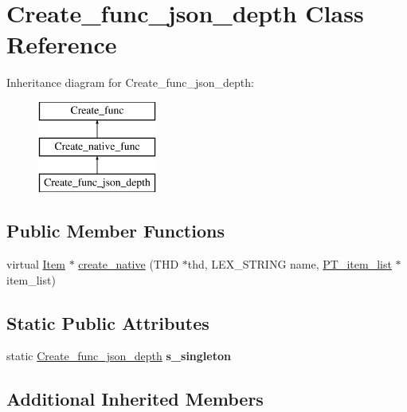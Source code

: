 \hypertarget{classCreate__func__json__depth}{}\section{Create\+\_\+func\+\_\+json\+\_\+depth Class Reference}
\label{classCreate__func__json__depth}
Inheritance diagram for Create\+\_\+func\+\_\+json\+\_\+depth\+:\begin{figure}[H]
\begin{center}
\leavevmode
\includegraphics[height=3.000000cm]{classCreate__func__json__depth}
\end{center}
\end{figure}
\subsection*{Public Member Functions}
\begin{DoxyCompactItemize}
\item 
virtual \mbox{\hyperlink{classItem}{Item}} $\ast$ \mbox{\hyperlink{classCreate__func__json__depth_a143fa7a6b3c0bf42055c7f039603bbbc}{create\+\_\+native}} (T\+HD $\ast$thd, L\+E\+X\+\_\+\+S\+T\+R\+I\+NG name, \mbox{\hyperlink{classPT__item__list}{P\+T\+\_\+item\+\_\+list}} $\ast$item\+\_\+list)
\end{DoxyCompactItemize}
\subsection*{Static Public Attributes}
\begin{DoxyCompactItemize}
\item 
\mbox{\label{classCreate__func__json__depth_ada16ed82d172235ac918c6f082177fa9}} 
static \mbox{\hyperlink{classCreate__func__json__depth}{Create\+\_\+func\+\_\+json\+\_\+depth}} {\bfseries s\+\_\+singleton}
\end{DoxyCompactItemize}
\subsection*{Additional Inherited Members}


